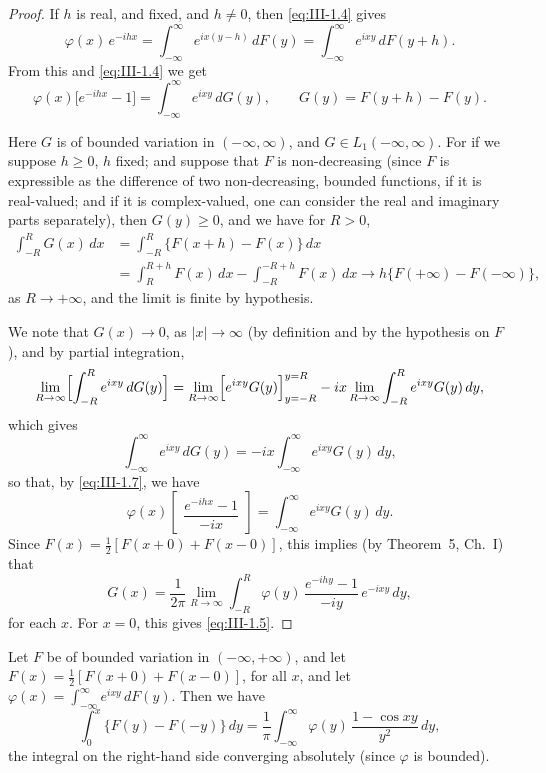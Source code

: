 \begin{proof}
If $h$ is real, and fixed, and $h\neq0$, then \eqref{eq:III-1.4} gives
\begin{equation}\tag{1.6}\label{eq:III-1.6}
\varphi(x)\,e^{-ihx}=\int_{-\infty}^{\infty}e^{ix(y-h)}\,dF(y)=\int_{-\infty}^{\infty}e^{ixy}\,dF(y+h).
\end{equation}
From this and \eqref{eq:III-1.4} we get
\begin{equation}\tag{1.7}\label{eq:III-1.7}
\varphi(x)\bigl[e^{-ihx}-1\bigr]=\int_{-\infty}^{\infty}e^{ixy}\,dG(y),\qquad G(y)=F(y+h)-F(y).
\end{equation}

Here $G$ is of bounded variation in $(-\infty,\infty)$, and $G\in L_{1}(-\infty,\infty)$. For if we suppose $h\ge0$, $h$ fixed; and suppose that $F$ is non-decreasing (since $F$ is expressible as the difference of two non-decreasing, bounded functions, if it is real-valued; and if it is complex-valued, one can consider the real and imaginary parts separately), then $G(y)\ge0$, and we have for $R>0$,
\[
\begin{aligned}
\int_{-R}^{R}G(x)\,dx &= \int_{-R}^{R}\bigl\{F(x+h)-F(x)\bigr\}\,dx\\
&= \int_{R}^{R+h}F(x)\,dx-\int_{-R}^{-R+h}F(x)\,dx\to h\bigl\{F(+\infty)-F(-\infty)\bigr\},
\end{aligned}
\]
as $R\to+\infty$, and the limit is finite by hypothesis.

We note that $G(x)\to0$, as $|x|\to\infty$ (by definition and by the hypothesis on $F$), and by partial integration,
\[
\lim_{R\to\infty}\Bigl[\int_{-R}^{R}e^{ixy}\,dG(y)\Bigr]
=\lim_{R\to\infty}\Bigl[e^{ixy}G(y)\Bigr]_{y=-R}^{y=R}-ix\lim_{R\to\infty}\int_{-R}^{R}e^{ixy}G(y)\,dy,
\]
which gives
\[
\int_{-\infty}^{\infty}e^{ixy}\,dG(y)=-ix\int_{-\infty}^{\infty}e^{ixy}G(y)\,dy,
\]
so that, by \eqref{eq:III-1.7}, we have
\[
\varphi(x)\begin{bmatrix}\dfrac{e^{-ihx}-1}{-ix}\end{bmatrix}
=\int_{-\infty}^{\infty}e^{ixy}G(y)\,dy.
\]
Since $F(x)=\frac12[F(x+0)+F(x-0)]$, this implies (by Theorem~5, Ch.~I) that
\[
G(x)=\frac{1}{2\pi}\lim_{R\to\infty}\int_{-R}^{R}\varphi(y)\,\frac{e^{-ihy}-1}{-iy}\,e^{-ixy}\,dy,
\]
for each $x$. For $x=0$, this gives \eqref{eq:III-1.5}.
\end{proof}

\begin{theorem}\label{thm:III-2}
Let $F$ be of bounded variation in $(-\infty,+\infty)$, and let $F(x)=\frac12[F(x+0)+F(x-0)]$, for all $x$, and let $\varphi(x)=\int_{-\infty}^{\infty}e^{ixy}\,dF(y)$. Then we have
\begin{equation}\tag{1.8}\label{eq:III-1.8}
\int_{0}^{x}\bigl\{F(y)-F(-y)\bigr\}\,dy=\frac{1}{\pi}\int_{-\infty}^{\infty}\varphi(y)\,\frac{1-\cos xy}{y^{2}}\,dy,
\end{equation}
the integral on the right-hand side converging absolutely (since $\varphi$ is bounded).
\end{theorem}

